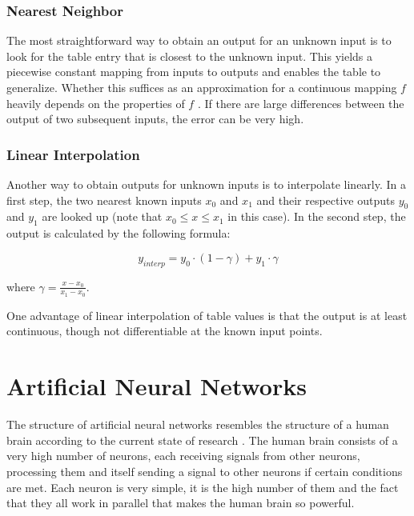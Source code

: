 \subsubsection{Nearest Neighbor}

The most straightforward way to obtain an output for an unknown input is to look for the table entry that is closest to the unknown input. This yields a piecewise constant mapping from inputs to outputs and enables the table to generalize. Whether this suffices as an approximation for a continuous mapping $f$ heavily depends on the properties of $f$ . If there are large differences between the output of two subsequent inputs, the error can be very high.

\subsubsection{Linear Interpolation}

Another way to obtain outputs for unknown inputs is to interpolate linearly. In a first step, the two nearest known inputs $x_0$ and $x_1$ and their respective outputs $y_0$ and $y_1$ are looked up (note that $x_0 \leq x \leq x_1$ in this case). In the second step, the output is calculated by the following formula:

\begin{equation}
y_{interp} = y_0 \cdot (1-\gamma) + y_1 \cdot \gamma
\end{equation}

where $\gamma = \frac{x - x_0}{x_1 - x_0}$.

One advantage of linear interpolation of table values is that the output is at least continuous, though not differentiable at the known input points.

\section{Artificial Neural Networks}

The structure of artificial neural networks resembles the structure of a human brain according to the current state of research \cite[Chapter~1.1]{Kriesel2007NeuralNetworks}. The human brain consists of a very high number of neurons, each receiving signals from other neurons, processing them and itself sending a signal to other neurons if certain conditions are met. Each neuron is very simple, it is the high number of them and the fact that they all work in parallel that makes the human brain so powerful. 


